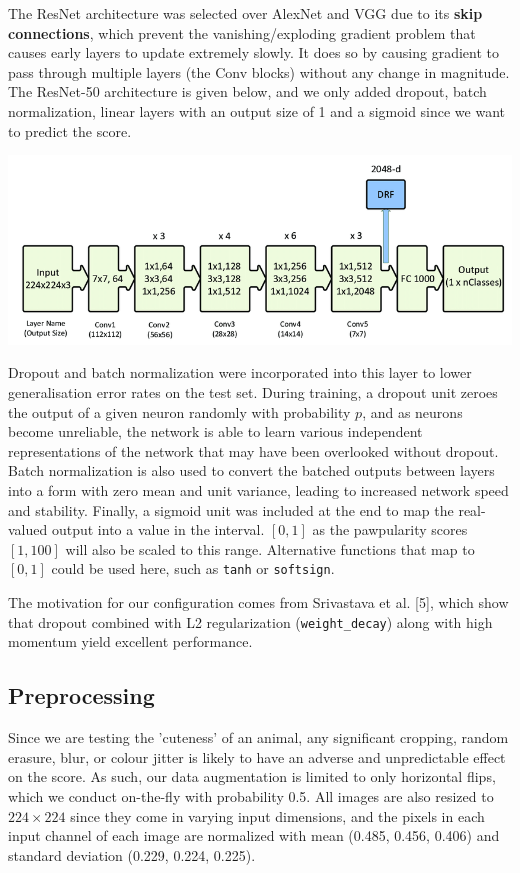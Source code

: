 \documentclass[12pt]{article}
\begin{document}
The ResNet architecture was selected over AlexNet and VGG due to its \textbf{skip connections}, which prevent the vanishing/exploding gradient problem that causes early layers to update extremely slowly. It does so by causing gradient to pass through multiple layers (the Conv blocks) without any change in magnitude. The ResNet-50 architecture is given below, and we only added dropout, batch normalization, linear layers with an output size of 1 and a sigmoid since we want to predict the score.\newline

\includegraphics[scale=0.3]{5_resnet50}

Dropout and batch normalization were incorporated into this layer to lower generalisation error rates on the test set. During training, a dropout unit zeroes the output of a given neuron randomly with probability $p$, and as neurons become unreliable, the network is able to learn various independent representations of the network that may have been overlooked without dropout. Batch normalization is also used to convert the batched outputs between layers into a form with zero mean and unit variance, leading to increased network speed and stability. Finally, a sigmoid unit was included at the end to map the real-valued output into a value in the interval. $[0,1]$ as the pawpularity scores $[1,100]$ will also be scaled to this range. Alternative functions that map to $[0,1]$ could be used here, such as \texttt{tanh} or \texttt{softsign}.\newline

The motivation for our configuration comes from Srivastava et al. [5], which show that dropout combined with L2 regularization (\texttt{weight\_decay}) along with high momentum yield excellent performance.

\subsection{Preprocessing}

Since we are testing the 'cuteness' of an animal, any significant cropping, random erasure, blur, or colour jitter is likely to have an adverse and unpredictable effect on the score. As such, our data augmentation is limited to only horizontal flips, which we conduct on-the-fly with probability 0.5. All images are also resized to $224\times 224$ since they come in varying input dimensions, and the pixels in each input channel of each image are normalized with mean (0.485, 0.456, 0.406) and standard deviation (0.229, 0.224, 0.225).
\end{document}
